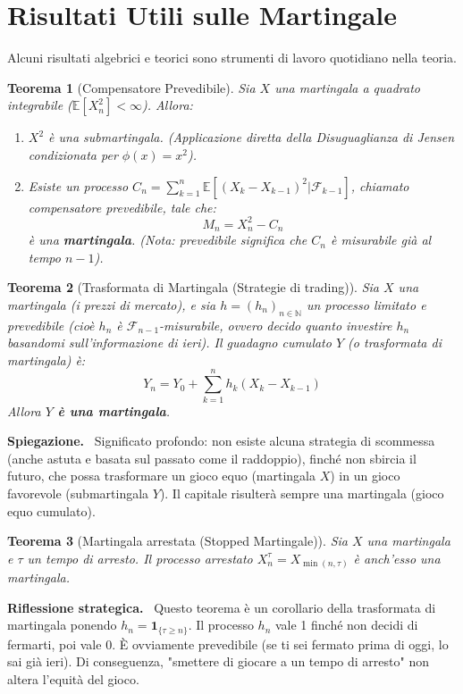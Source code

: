 \documentclass[11pt, a4paper]{report}
\theoremstyle{plain}
\newtheorem{theorem}{Teorema}[chapter]
\theoremstyle{definition}
\theoremstyle{remark}
\newenvironment{hint}[1][Hint]
{\begin{mdframed}[backgroundcolor=blue!5, linecolor=blue!50, linewidth=2pt, topline=false, rightline=false, bottomline=false]
\textbf{\textsf{#1.}}\ }
{\end{mdframed}}
\newenvironment{spiegazione}[1][Spiegazione]
{\begin{mdframed}[backgroundcolor=green!5, linecolor=green!50, linewidth=2pt, topline=false, rightline=false, bottomline=false]
\textbf{\textsf{#1.}}\ }
{\end{mdframed}}
\newcommand{\E}{\mathbb{E}}
\newcommand{\F}{\mathcal{F}}
\newcommand{\N}{\mathbb{N}}
\newcommand{\1}{\mathbf{1}}
\begin{document}
\section{Risultati Utili sulle Martingale}

Alcuni risultati algebrici e teorici sono strumenti di lavoro quotidiano nella teoria.

\begin{theorem}[Compensatore Prevedibile]
Sia $X$ una martingala a quadrato integrabile ($\E[X_n^2] < \infty$). Allora:
\begin{enumerate}
    \item $X^2$ è una \emph{submartingala}. (Applicazione diretta della Disuguaglianza di Jensen condizionata per $\phi(x)=x^2$).
    \item Esiste un processo $C_n = \sum_{k=1}^n \E[(X_k - X_{k-1})^2 | \F_{k-1}]$, chiamato \emph{compensatore prevedibile}, tale che:
    \[ M_n = X_n^2 - C_n \]
    è una \textbf{martingala}. (Nota: prevedibile significa che $C_n$ è misurabile già al tempo $n-1$).
\end{enumerate}
\end{theorem}

\begin{theorem}[Trasformata di Martingala (Strategie di trading)]
Sia $X$ una martingala (i prezzi di mercato), e sia $h = (h_n)_{n \in \N}$ un processo limitato e \emph{prevedibile} (cioè $h_n$ è $\F_{n-1}$-misurabile, ovvero decido quanto investire $h_n$ basandomi sull'informazione di ieri).
Il guadagno cumulato $Y$ (o trasformata di martingala) è:
\[ Y_n = Y_0 + \sum_{k=1}^n h_k (X_k - X_{k-1}) \]
Allora \textbf{$Y$ è una martingala}.
\end{theorem}
\begin{spiegazione}
Significato profondo: non esiste alcuna strategia di scommessa (anche astuta e basata sul passato come il raddoppio), finché non sbircia il futuro, che possa trasformare un gioco equo (martingala $X$) in un gioco favorevole (submartingala $Y$). Il capitale risulterà sempre una martingala (gioco equo cumulato).
\end{spiegazione}

\begin{theorem}[Martingala arrestata (Stopped Martingale)]
Sia $X$ una martingala e $\tau$ un tempo di arresto. Il processo arrestato $X_n^\tau = X_{\min(n, \tau)}$ è anch'esso una martingala.
\end{theorem}
\begin{hint}[Riflessione strategica]
Questo teorema è un corollario della trasformata di martingala ponendo $h_n = \mathbf{1}_{\{\tau \ge n\}}$.
Il processo $h_n$ vale 1 finché non decidi di fermarti, poi vale 0. È ovviamente prevedibile (se ti sei fermato prima di oggi, lo sai già ieri). Di conseguenza, "smettere di giocare a un tempo di arresto" non altera l'equità del gioco.
\end{hint}
\end{document}
